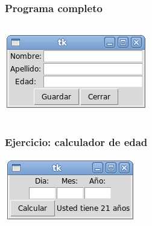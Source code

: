 \documentclass[12pt]{beamer}
\begin{document}
  \begin{frame}
    \label{programa-marcos}
    \frametitle{Programa completo}
    \begin{columns}[B]
        \tiny
        
        \vspace{24ex}
        \includegraphics[width=\textwidth]{programas/tkinter/capturas/13.png}
    \end{columns}
  \end{frame}

  \begin{frame}
    \label{ejercicio-edad}
    \frametitle{Ejercicio: calculador de edad}
    \begin{center}
      \includegraphics[width=.8\textwidth]{programas/tkinter/capturas/14.png}
    \end{center}
  \end{frame}
\end{document}
